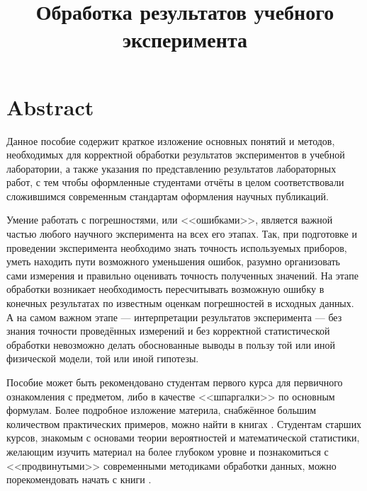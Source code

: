 \documentclass[oneside]{book}
\begin{document}
\title{Обработка результатов учебного эксперимента}


\maketitle
\tableofcontents

\listoftodos

\chapter*{Abstract}
    Данное пособие содержит краткое изложение основных понятий и методов,
    необходимых для корректной обработки результатов экспериментов в учебной
    лаборатории, а также указания по представлению результатов лабораторных
    работ, с тем чтобы оформленные студентами отчёты в целом соответствовали
    сложившимся современным стандартам оформления научных публикаций.
    
    Умение работать с погрешностями, или <<ошибками>>,
    является важной частью любого научного эксперимента на всех его этапах.
    Так, при подготовке и проведении эксперимента необходимо знать точность
    используемых приборов, уметь находить пути возможного уменьшения ошибок,
    разумно организовать сами измерения и правильно оценивать точность
    полученных значений. На этапе обработки возникает необходимость пересчитывать
    возможную ошибку в конечных результатах по известным оценкам погрешностей
    в исходных данных. А на самом важном этапе --- интерпретации
    результатов эксперимента --- без знания точности проведённых
    измерений и без корректной статистической обработки невозможно делать
    обоснованные выводы в пользу той или иной физической модели, той или
    иной гипотезы. 
    
    Пособие может быть рекомендовано студентам первого курса для первичного
    ознакомления с предметом, либо в качестве <<шпаргалки>>
    по основным формулам. Более подробное изложение материла, снабжённое
    большим количеством практических примеров, можно найти в книгах
    \cite{taylor,squires,zaidel}. Студентам старших курсов, знакомым
    с основами теории вероятностей и математической статистики, желающим
    изучить материал на более глубоком уровне и познакомиться с <<продвинутыми>>
    современными методиками обработки данных, можно порекомендовать начать
    с книги \cite{hudson}.
\end{document}
